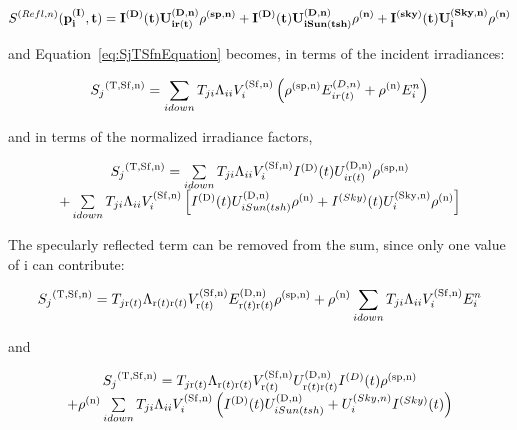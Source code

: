 \begin{equation}
S^{(Refl,n)}(\bf{p}_i^{(I)},t) =
  I^{(D)}(t) U_{i r(t)}^{(D,n)} \rho^{(sp,n)} +
  I^{(D)}(t) U_{i Sun(tsh)}^{(D,n)} \rho^{(n)} +
  I^{(sky)}(t) U_i^{(Sky,n)} \rho^{(n)}
\end{equation}

and Equation~\ref{eq:SjTSfnEquation} becomes, in terms of the incident irradiances:

\begin{equation}
{S_j}^{{\rm{(T, Sf, n)}}} = \sum\limits_{i{\rm{ }}down} {{T_{ji}}{\Lambda_{ii}}V_i^{{\rm{(Sf, n)}}}\left( {{\rho ^{{\rm{(sp, n)}}}}E_{i{\rm{ }}r(t)}^{(D,n)} + {\rho ^{{\rm{(n)}}}}E_i^n} \right)}
\end{equation}

and in terms of the normalized irradiance factors,

\begin{equation}
\begin{array}{c}{S_j}^{{\rm{(T, Sf, n)}}} = \sum\limits_{i{\rm{ }}down} {{T_{ji}}{\Lambda_{ii}}V_i^{{\rm{(Sf, n)}}}{I^{{\rm{(D)}}}}(t)U_{i{\rm{ r(}}t{\rm{)}}}^{{\rm{(D,n)}}}{\rho ^{{\rm{(sp, n)}}}}} \\ + \sum\limits_{i{\rm{ }}down} {{T_{ji}}{\Lambda_{ii}}V_i^{{\rm{(Sf, n)}}}\left[ {{I^{{\rm{(D)}}}}(t)U_{i{\rm{ }}Sun(tsh)}^{{\rm{(D,n)}}}{\rho ^{{\rm{(n)}}}} + {I^{(Sky)}}(t)U_i^{{\rm{(Sky,n)}}}{\rho ^{{\rm{(n)}}}}} \right]} \end{array}
\label{eq:SjTSfnidownEquation}
\end{equation}

The specularly reflected term can be removed from the sum, since only one value of i can contribute:

\begin{equation}
{S_j}^{{\rm{(T, Sf, n)}}} = {T_{j{\rm{ r(}}t{\rm{)}}}}{\Lambda_{{\rm{ r(}}t{\rm{) r(}}t{\rm{)}}}}V_{{\rm{ r(}}t{\rm{)}}}^{{\rm{(Sf, n)}}}E_{{\rm{ r(}}t{\rm{) r(}}t{\rm{)}}}^{{\rm{(D,n)}}}{\rho ^{{\rm{(sp, n)}}}} + {\rho ^{{\rm{(n)}}}}\sum\limits_{i{\rm{ }}down} {{T_{ji}}{\Lambda_{ii}}V_i^{{\rm{(Sf, n)}}}E_i^n}
\end{equation}

and

\begin{equation}
\begin{array}{c}{S_j}^{{\rm{(T, Sf, n)}}} = {T_{j{\rm{ r(}}t{\rm{)}}}}{\Lambda_{{\rm{ r(}}t{\rm{) r(}}t{\rm{)}}}}V_{{\rm{ r(}}t{\rm{)}}}^{{\rm{(Sf, n)}}}U_{{\rm{ r(}}t{\rm{) r(}}t{\rm{)}}}^{{\rm{(D,n)}}}{I^{(D)}}(t){\rho ^{{\rm{(sp, n)}}}}\\ + {\rho ^{{\rm{(n)}}}}\sum\limits_{i{\rm{ }}down} {{T_{ji}}{\Lambda_{ii}}V_i^{{\rm{(Sf, n)}}}\left( {{I^{{\rm{(D)}}}}(t)U_{i{\rm{ }}Sun(tsh)}^{{\rm{(D,n)}}} + U_i^{(Sky,n)}{I^{(Sky)}}(t)} \right)} \end{array}
\end{equation}

